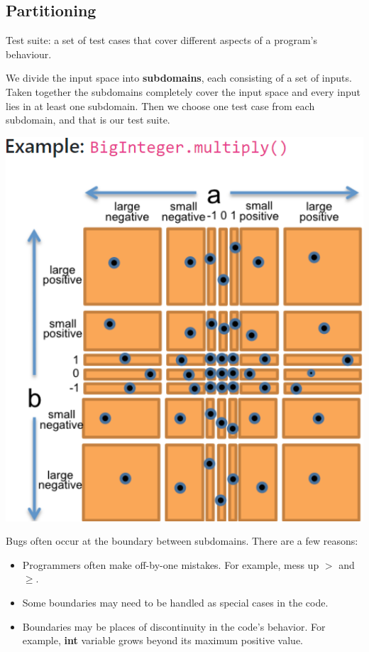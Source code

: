 \documentclass[letterpaper,12pt]{article}
\begin{document}
\subsection{Partitioning}
Test suite: a set of test cases that cover different aspects of a program's
behaviour.

We divide the input space into \textbf{subdomains}, each consisting of a set of
inputs. Taken together the subdomains completely cover the input space and
every input lies in at least one subdomain. Then we choose one test case from
each subdomain, and that is our test suite.

\includegraphics*{./summary_image/Partitioning example.png}

Bugs often occur at the boundary between subdomains. There are a few reasons:
\begin{itemize}
      \item Programmers often make off-by-one mistakes. For example, mess up $>$ and $\ge$.
      \item Some boundaries may need to be handled as special cases in the code.
      \item Boundaries may be places of discontinuity in the code's behavior. For
            example, \textbf{int} variable grows beyond its maximum positive value.
\end{itemize}
\end{document}
